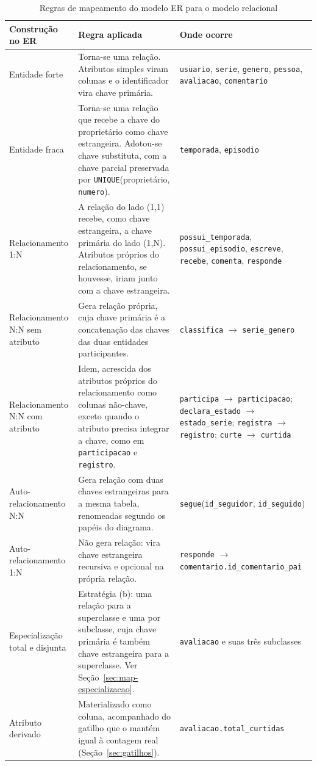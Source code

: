 \documentclass[a4paper,12pt,oneside,openany]{book}
\newcommand{\id}[1]{\texttt{#1}}
\begin{document}
\begin{table}[H]
\centering
\caption{Regras de mapeamento do modelo ER para o modelo relacional}
\label{tab:mapeamento}
\small
\begin{tabularx}{\textwidth}{@{}lXX@{}}
\toprule
\textbf{Construção no ER} & \textbf{Regra aplicada} & \textbf{Onde ocorre} \\
\midrule
Entidade forte & Torna-se uma relação. Atributos simples viram colunas e o
identificador vira chave primária. &
\id{usuario}, \id{serie}, \id{genero}, \id{pessoa}, \id{avaliacao}, \id{comentario} \\
\addlinespace
Entidade fraca & Torna-se uma relação que recebe a chave do proprietário como chave
estrangeira. Adotou-se chave substituta, com a chave parcial preservada por
\id{UNIQUE}(proprietário, \id{numero}). &
\id{temporada}, \id{episodio} \\
\addlinespace
Relacionamento 1:N & A relação do lado (1,1) recebe, como chave estrangeira, a chave
primária do lado (1,N). Atributos próprios do relacionamento, se houvesse, iriam
junto com a chave estrangeira. &
\id{possui\_temporada}, \id{possui\_episodio}, \id{escreve}, \id{recebe}, \id{comenta}, \id{responde} \\
\addlinespace
Relacionamento N:N sem atributo & Gera relação própria, cuja chave primária é a
concatenação das chaves das duas entidades participantes. &
\id{classifica} $\rightarrow$ \id{serie\_genero} \\
\addlinespace
Relacionamento N:N com atributo & Idem, acrescida dos atributos próprios do relacionamento como colunas não-chave, exceto quando o atributo precisa integrar a chave, como em \id{participacao} e \id{registro}. &
\id{participa} $\rightarrow$ \id{participacao}; \id{declara\_estado} $\rightarrow$
\id{estado\_serie}; \id{registra} $\rightarrow$ \id{registro}; \id{curte}
$\rightarrow$ \id{curtida} \\
\addlinespace
Auto-relacionamento N:N & Gera relação com duas chaves estrangeiras para a mesma
tabela, renomeadas segundo os papéis do diagrama. &
\id{segue}(\id{id\_seguidor}, \id{id\_seguido}) \\
\addlinespace
Auto-relacionamento 1:N & Não gera relação: vira chave estrangeira recursiva e
opcional na própria relação. &
\id{responde} $\rightarrow$ \id{comentario.id\_comentario\_pai} \\
\addlinespace
Especialização total e disjunta & Estratégia (b): uma relação para a superclasse e
uma por subclasse, cuja chave primária é também chave estrangeira para a
superclasse. Ver Seção~\ref{sec:map-especializacao}. &
\id{avaliacao} e suas três subclasses \\
\addlinespace
Atributo derivado & Materializado como coluna, acompanhado do gatilho que o mantém
igual à contagem real (Seção~\ref{sec:gatilhos}). &
\id{avaliacao.total\_curtidas} \\
\bottomrule
\end{tabularx}
\end{table}
\end{document}
